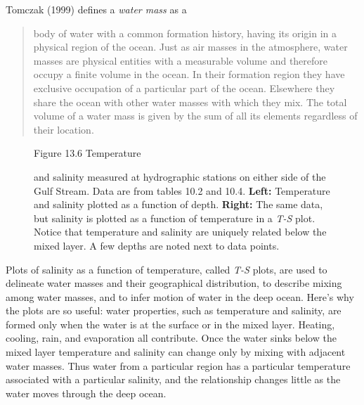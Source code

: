 Tomczak (1999) defines a \textit{water mass}
as a
\begin{quote} \small
body of water with a common formation history, having its origin in a
physical region of the ocean. Just as air masses in the atmosphere,
water masses are physical entities with a measurable volume and
therefore occupy a finite volume in the ocean. In their formation
region they have exclusive occupation of a particular part of the
ocean. Elsewhere they share the ocean with other water masses with
which they mix. The total volume of a water mass is given by the sum
of all its elements regardless of their location.
\end{quote}

\begin{figure}[b!]
\vspace{-2ex}
\footnotesize
Figure 13.6 Temperature \rule{0mm}{3ex}and salinity measured at
hydrographic stations on
either side of the Gulf Stream.
Data are from tables 10.2 and 10.4.  \textbf{Left:} Temperature
and salinity plotted as a function of depth.  \textbf{Right:} The same
data, but salinity is plotted as a function of temperature in a
\textit{T-S} plot. Notice that temperature and salinity are uniquely
related below the mixed layer. A few
depths are noted next to data points.
\label{fig:GulfStreamTSDPlot}
\end{figure}

Plots of salinity as a function of temperature, called \textit{T-S}
plots, are used to delineate water masses and their geographical
distribution, to describe mixing
among water masses, and to infer motion of water in the deep
ocean. Here's why the plots are so useful: water properties, such as
temperature and salinity, are formed only when the water is at the
surface or in the mixed layer. Heating, cooling, rain, and evaporation all
contribute. Once the water sinks below the mixed layer temperature and salinity can change only by
mixing with adjacent water
masses. Thus water from a particular region has a particular
temperature associated with a particular salinity, and the
relationship changes little as the water moves through the deep ocean.

